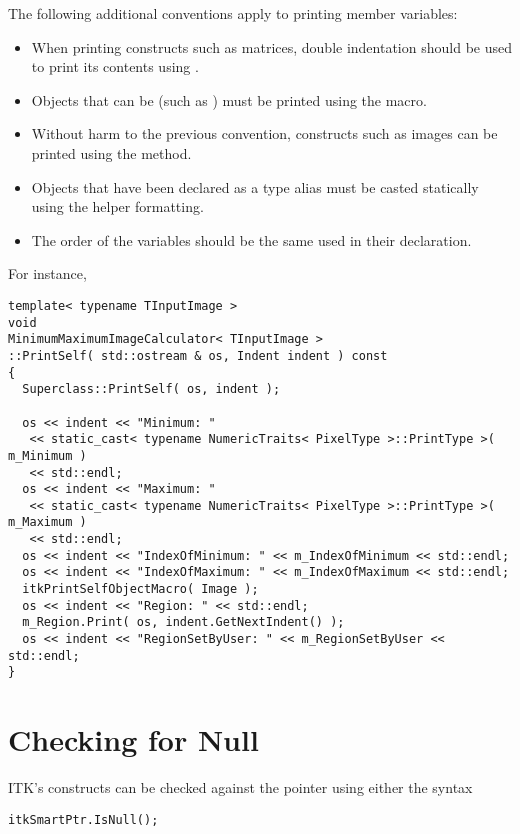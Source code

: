 The following additional conventions apply to printing member variables:
\begin{itemize}
\item When printing constructs such as matrices, double indentation should be
used to print its contents using .
\item Objects that can be  (such as ) must be
printed using the  macro.
\item Without harm to the previous convention, constructs such as images can
be printed using the  method.
\item Objects that have been declared as a type alias must be casted
statically using the  helper
formatting.
\item The order of the variables should be the same used in their declaration.
\end{itemize}

For instance,

\small
\begin{verbatim}
template< typename TInputImage >
void
MinimumMaximumImageCalculator< TInputImage >
::PrintSelf( std::ostream & os, Indent indent ) const
{
  Superclass::PrintSelf( os, indent );

  os << indent << "Minimum: "
   << static_cast< typename NumericTraits< PixelType >::PrintType >( m_Minimum )
   << std::endl;
  os << indent << "Maximum: "
   << static_cast< typename NumericTraits< PixelType >::PrintType >( m_Maximum )
   << std::endl;
  os << indent << "IndexOfMinimum: " << m_IndexOfMinimum << std::endl;
  os << indent << "IndexOfMaximum: " << m_IndexOfMaximum << std::endl;
  itkPrintSelfObjectMacro( Image );
  os << indent << "Region: " << std::endl;
  m_Region.Print( os, indent.GetNextIndent() );
  os << indent << "RegionSetByUser: " << m_RegionSetByUser << std::endl;
}
\end{verbatim}
\normalsize


\section{Checking for Null}
\label{sec:CheckingForNull}

ITK's  constructs can be checked against the 
pointer using either the syntax

\small
\begin{verbatim}
itkSmartPtr.IsNull();
\end{verbatim}
\normalsize

